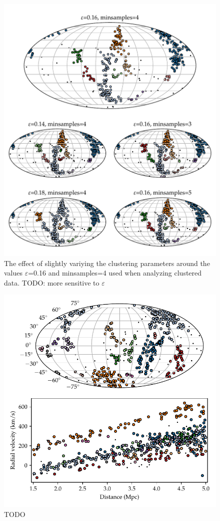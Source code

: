 \documentclass[english, oneside]{HYgradu}
\begin{document}
\begin{figure}
    \centering
    \includegraphics{kuvat/smallClusteringVariations.pdf}
    \caption{The effect of slightly variying the clustering parameters around the values $\varepsilon$=0.16 and minsamples=4 used when analyzing clustered data. TODO: more sensitive to $\varepsilon$}\label{fig:clusteringvariations}
\end{figure}

\begin{figure}
    \centering
    \includegraphics{kuvat/mollweide+hubble.pdf}
    \caption{TODO}\label{fig:mollweide+hubble}
\end{figure}
\end{document}
